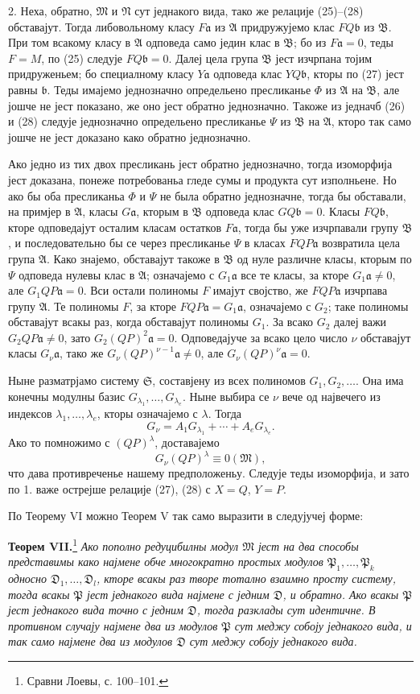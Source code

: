 ﻿\documentclass[11pt]{article}
\providecommand{\mM}{\mathfrak M}
\providecommand{\mN}{\mathfrak N}
\providecommand{\mA}{\mathfrak A}
\providecommand{\mB}{\mathfrak B}
\providecommand{\mP}{\mathfrak P}
\providecommand{\mD}{\mathfrak D}
\providecommand{\mS}{\mathfrak S}
\providecommand{\ma}{\mathfrak a}
\providecommand{\mb}{\mathfrak b}
\begin{document}
2. Неха, обратно, \(\mM\) и \(\mN\) сут једнакого вида, тако же релације (25)--(28) обставајут. Тогда либовольному класу \(F\ma\) из \(\mA\) придружујемо клас \(FQ\mb\) из \(\mB\). При том всакому класу в \(\mA\) одповеда само једин клас в \(\mB\); бо из \(F\ma=0\), теды \(F=M\), по (25) следује \(FQ\mb=0\). Далеј цела група \(\mB\) јест изчрпана тојим придруженьем; бо специалному класу \(Y\ma\) одповеда клас \(YQ\mb\), кторы по (27) јест равны \(\mb\). Теды имајемо једнозначно определьено пресликанье \(\Phi\) из \(\mA\) на \(\mB\), але јошче не јест показано, же оно јест обратно једнозначно. Такоже из једначб (26) и (28) следује једнозначно определьено пресликанье \(\Psi\) из \(\mB\) на \(\mA\), кторо так само јошче не јест доказано како обратно једнозначно.

Ако једно из тих двох пресликань јест обратно једнозначно, тогда изоморфија јест доказана, понеже потребованьа гледе сумы и продукта сут изполньене. Но ако бы оба пресликаньа \(\Phi\) и \(\Psi\) не была обратно једнозначне, тогда бы обставали, на примјер в \(\mA\), класы \(G\ma\), кторым в \(\mB\) одповеда клас \(GQ\mb=0\). Класы \(FQ\mb\), кторе одповедајут осталим класам остатков \(F\ma\), тогда бы уже изчрпавали групу \(\mB\), и последовательно бы се через пресликанье \(\Psi\) в класах \(FQP\ma\) возвратила цела група \(\mA\). Како знајемо, обставајут такоже в \(\mB\) од нуле различне класы, кторым по \(\Psi\) одповеда нулевы клас в \(\mA\); означајемо с \(G_1\ma\) все те класы, за кторе \(G_1\ma\ne0\), але \(G_1QP\ma=0\). Вси остали полиномы \(F\) имајут својство, же \(FQP\ma\) изчрпава групу \(\mA\). Те полиномы \(F\), за кторе \(FQP\ma=G_1\ma\), означајемо с \(G_2\); таке полиномы обставајут всакы раз, когда обставајут полиномы \(G_1\). За всако \(G_2\) далеј важи \(G_2QP\ma\ne0\), зато \(G_2(QP)^2\ma=0\). Одповедајуче за всако цело число \(\nu\) обставајут класы \(G_\nu\ma\), тако же \(G_\nu(QP)^{\nu-1}\ma\ne0\), але \(G_\nu(QP)^\nu\ma=0\).

Ныне разматрјамо систему \(\mS\), составјену из всех полиномов \(G_1,G_2,\ldots\). Она има конечны модулны базис \(G_{\lambda_1},\ldots,G_{\lambda_e}\). Ныне выбира се \(\nu\) вече од највечего из индексов \(\lambda_1,\ldots,\lambda_e\), кторы означајемо с \(\lambda\). Тогда
\[
 G_\nu=A_1G_{\lambda_1}+\cdots+A_eG_{\lambda_e}.
\]
Ако то помножимо с \((QP)^\lambda\), доставајемо
\[
 G_\nu(QP)^\lambda\equiv0(\mM),
\]
что дава противреченье нашему предположеньу. Следује теды изоморфија, и зато по 1. важе острејше релације (27), (28) с \(X=Q\), \(Y=P\).

По Теорему VI можно Теорем V так само выразити в следујучеј форме:

\textbf{Теорем VII.}\footnote{Сравни Лоевы, с. 100--101.} \textit{Ако пополно редуцибилны модул \(\mM\) јест на два способы представимы како најмене обче многократно простых модулов \(\mP_1,\ldots,\mP_k\) односно \(\mD_1,\ldots,\mD_l\), кторе всакы раз творе тотално взаимно просту систему, тогда всакы \(\mP\) јест једнакого вида најмене с једним \(\mD\), и обратно. Ако всакы \(\mP\) јест једнакого вида точно с једним \(\mD\), тогда разклады сут идентичне. В противном случају најмене два из модулов \(\mP\) сут меджу собоју једнакого вида, и так само најмене два из модулов \(\mD\) сут меджу собоју једнакого вида.}
\end{document}

